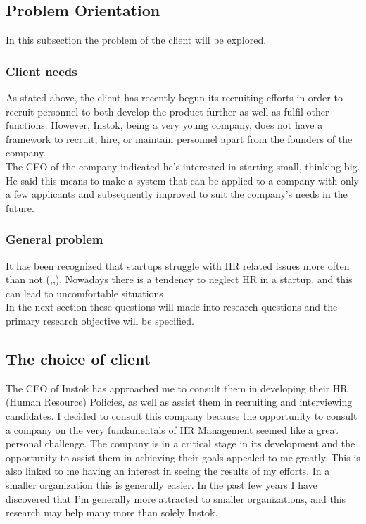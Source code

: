 \documentclass[man]{apa6}
\begin{document}
\subsection{Problem Orientation}
In this subsection the problem of the client will be explored.\\
\subsubsection{Client needs}
As stated above, the client has recently begun its recruiting efforts in order to recruit personnel to both develop the product further as well as fulfil other functions. However, Instok, being a very young company, does not have a framework to recruit, hire, or maintain personnel apart from the founders of the company. \\
The CEO of the company indicated he's interested in starting small, thinking big. He said this means to make a system that can be applied to a company with only a few applicants and subsequently improved to suit the company's needs in the future.

\subsubsection{General problem} It has been recognized that startups struggle with HR related issues more often than not (\parencite{FUNG2012},\parencite{WEISSMAN2016},\parencite{BUCH2016}). Nowadays there is a tendency to neglect HR in a startup, and this can lead to uncomfortable situations \parencite{WEISSMAN2016}. \\
In the next section these questions will made into research questions and the primary research objective will be specified.

\subsection{The choice of client}
The CEO of Instok has approached me to consult them in developing their HR (Human Resource) Policies, as well as assist them in recruiting and interviewing candidates. I decided to consult this company because the opportunity to consult a company on the very fundamentals of HR Management seemed like a great personal challenge. The company is in a critical stage in its development and the opportunity to assist them in achieving their goals appealed to me greatly. This is also linked to me having an interest in seeing the results of my efforts. In a smaller organization this is generally easier. In the past few years I have discovered that I'm generally more attracted to smaller organizations, and this research may help many more than solely Instok.
\end{document}
